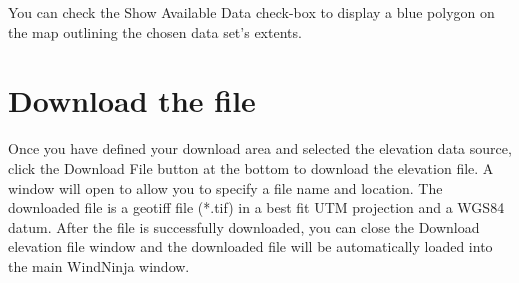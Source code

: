 \documentclass[12pt,oneside,final]{article}
\begin{document}
\noindent
You can check the Show Available Data check-box to display a blue polygon on
the map outlining the chosen data set's extents.

\section{Download the file}

Once you have defined your download area and selected the elevation data
source, click the Download File button at the bottom to download the elevation
file.  A window will open to allow you to specify a file name and location.
The downloaded file is a geotiff file (*.tif) in a best fit UTM projection and
a WGS84 datum.  After the file is successfully downloaded, you can close the
Download elevation file window and the downloaded file will be automatically
loaded into the main WindNinja window.
\end{document}
